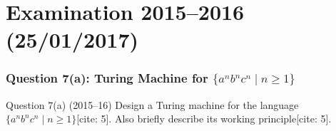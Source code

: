 \documentclass[11pt,a4paper]{article}
\begin{document}
\part{Examination 2015--2016 (25/01/2017)}

\section{Question 7(a): Turing Machine for $\{a^n b^n c^n \mid n \ge 1\}$}
\begin{questionbox}{Question 7(a) (2015--16)}
Design a Turing machine for the language $\{a^n b^n c^n \mid n \ge 1\}$[cite: 5]. Also briefly describe its working principle[cite: 5].
\end{questionbox}
\end{document}
